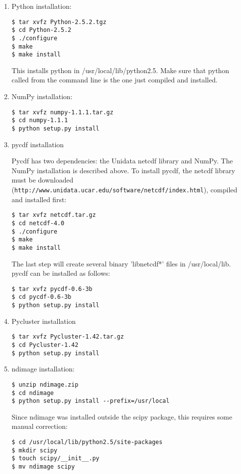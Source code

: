 \begin{enumerate}

\item Python installation:

\begin{verbatim}
$ tar xvfz Python-2.5.2.tgz
$ cd Python-2.5.2
$ ./configure
$ make
$ make install
\end{verbatim}

\noindent
This installs python in /usr/local/lib/python2.5.  Make sure that python called
from the command line is the one just compiled and installed.

\item NumPy installation:

\begin{verbatim}
$ tar xvfz numpy-1.1.1.tar.gz
$ cd numpy-1.1.1
$ python setup.py install
\end{verbatim}

\item pycdf installation

Pycdf has two dependencies: the Unidata netcdf library and NumPy. The NumPy
installation is described above. To install pycdf, the netcdf library must
be downloaded ({\tt http://www.unidata.ucar.edu/software/netcdf/index.html}),
compiled and installed first:

\begin{verbatim}
$ tar xvfz netcdf.tar.gz
$ cd netcdf-4.0
$ ./configure
$ make
$ make install
\end{verbatim}

The last step will create several binary 'libnetcdf*' files in /usr/local/lib.
pycdf can be installed as follows:

\begin{verbatim}
$ tar xvfz pycdf-0.6-3b
$ cd pycdf-0.6-3b
$ python setup.py install
\end{verbatim}

\item Pycluster installation

\begin{verbatim}
$ tar xvfz Pycluster-1.42.tar.gz
$ cd Pycluster-1.42
$ python setup.py install
\end{verbatim}

\item ndimage installation:

\begin{verbatim}
$ unzip ndimage.zip
$ cd ndimage
$ python setup.py install --prefix=/usr/local
\end{verbatim}

\noindent
Since ndimage was installed outside the scipy package, this requires some manual
correction:

\begin{verbatim}
$ cd /usr/local/lib/python2.5/site-packages
$ mkdir scipy
$ touch scipy/__init__.py
$ mv ndimage scipy
\end{verbatim}

\end{enumerate}


